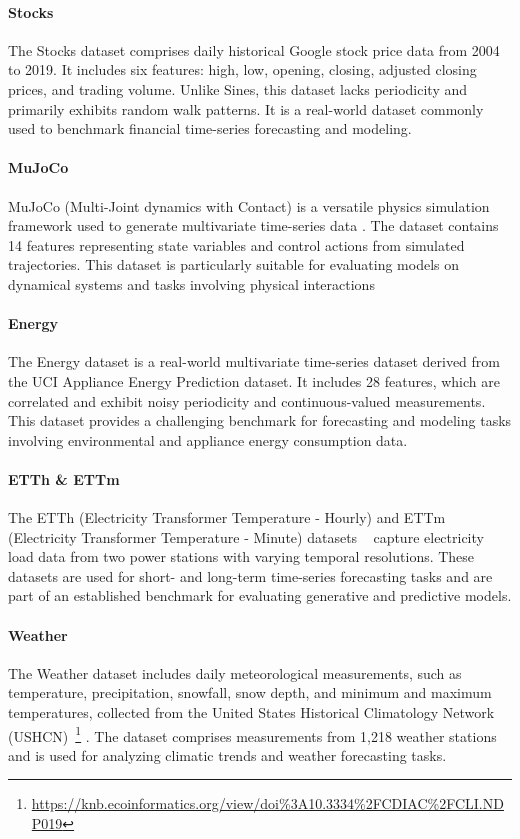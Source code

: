 \documentclass{article}
\theoremstyle{plain}
\theoremstyle{definition}
\theoremstyle{remark}
\begin{document}
{\paragraph{Stocks} 
The Stocks dataset comprises daily historical Google stock price data from 2004 to 2019. It includes six features: high, low, opening, closing, adjusted closing prices, and trading volume. Unlike Sines, this dataset lacks periodicity and primarily exhibits random walk patterns. It is a real-world dataset commonly used to benchmark financial time-series forecasting and modeling.

\paragraph{MuJoCo} 
MuJoCo (Multi-Joint dynamics with Contact) is a versatile physics simulation framework used to generate multivariate time-series data \cite{todorov2012mujoco}. The dataset contains 14 features representing state variables and control actions from simulated trajectories. This dataset is particularly suitable for evaluating models on dynamical systems and tasks involving physical interactions 

\paragraph{Energy} 
The Energy dataset is a real-world multivariate time-series dataset \cite{candanedo2017data} derived from the UCI Appliance Energy Prediction dataset. It includes 28 features, which are correlated and exhibit noisy periodicity and continuous-valued measurements. This dataset provides a challenging benchmark for forecasting and modeling tasks involving environmental and appliance energy consumption data.

\paragraph{ETTh \& ETTm} 
The ETTh (Electricity Transformer Temperature - Hourly) and ETTm (Electricity Transformer Temperature - Minute) datasets ~\cite{zhou2021informer} capture electricity load data from two power stations with varying temporal resolutions. These datasets are used for short- and long-term time-series forecasting tasks and are part of an established benchmark for evaluating generative and predictive models.

\paragraph{Weather} 
The Weather dataset includes daily meteorological measurements, such as temperature, precipitation, snowfall, snow depth, and minimum and maximum temperatures, collected from the United States Historical Climatology Network (USHCN)~\footnote{\url{https://knb.ecoinformatics.org/view/doi\%3A10.3334\%2FCDIAC\%2FCLI.NDP019}} . The dataset comprises measurements from 1,218 weather stations and is used for analyzing climatic trends and weather forecasting tasks.

}
\end{document}
